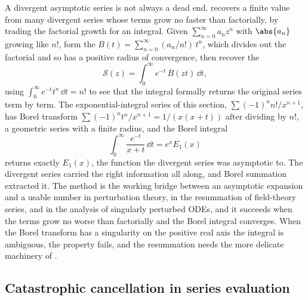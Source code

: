 A divergent asymptotic series is not always a dead end.  recovers a finite value from many divergent series whose
terms grow no faster than factorially, by trading the factorial growth
for an integral. Given $\sum_{n=0}^{\infty} a_{n} z^{n}$ with
$\abs{a_{n}}$ growing like $n!$, form the 
$B(t) = \sum_{n=0}^{\infty} (a_{n}/n!)\, t^{n}$, which divides out the
factorial and so has a positive radius of convergence, then recover the
\[
\mathcal{S}(z) = \int_{0}^{\infty} e^{-t}\, B(zt)\,\dd t,
\]
using $\int_{0}^{\infty} e^{-t} t^{n}\,\dd t = n!$ to see that the
integral formally returns the original series term by term. The
exponential-integral series of this section, $\sum (-1)^{n}
n!/x^{n+1}$, has Borel transform $\sum (-1)^{n} t^{n}/x^{n+1} =
1/(x(x + t))$ after dividing by $n!$, a geometric series with a finite
radius, and the Borel integral
\[
\int_{0}^{\infty} \frac{e^{-t}}{x + t}\,\dd t = e^{x} E_{1}(x)
\]
returns exactly $E_{1}(x)$, the function the divergent series was
asymptotic to. The divergent series carried the right information all
along, and Borel summation extracted it. The method is the working
bridge between an asymptotic expansion and a usable number in
perturbation theory, in the resummation of field-theory series, and in
the analysis of singularly perturbed ODEs, and it succeeds when the
terms grow no worse than factorially and the Borel integral converges.
When the Borel transform has a singularity on the positive real axis
the integral is ambiguous, the  property fails,
and the resummation needs the more delicate machinery of
\cite{text:v2ch04-bender-orszag-1999}.

\subsection{Catastrophic cancellation in series evaluation}

